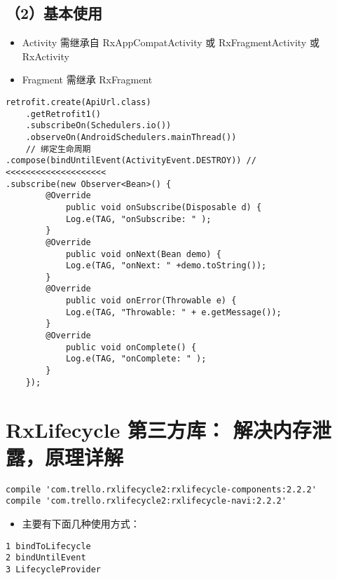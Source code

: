 \documentclass[9pt, b5paper]{article}
\begin{document}
\subsection{（2）基本使用}
\label{sec-19-4}
\begin{itemize}
\item Activity 需继承自 RxAppCompatActivity 或 RxFragmentActivity 或 RxActivity
\item Fragment 需继承  RxFragment
\end{itemize}
\begin{verbatim}
retrofit.create(ApiUrl.class)
    .getRetrofit1()
    .subscribeOn(Schedulers.io())
    .observeOn(AndroidSchedulers.mainThread())
    // 绑定生命周期
.compose(bindUntilEvent(ActivityEvent.DESTROY)) // <<<<<<<<<<<<<<<<<<<< 
.subscribe(new Observer<Bean>() {
        @Override
            public void onSubscribe(Disposable d) {
            Log.e(TAG, "onSubscribe: " );
        }
        @Override
            public void onNext(Bean demo) {
            Log.e(TAG, "onNext: " +demo.toString());
        }
        @Override
            public void onError(Throwable e) {
            Log.e(TAG, "Throwable: " + e.getMessage());
        }
        @Override
            public void onComplete() {
            Log.e(TAG, "onComplete: " );
        }
    });
\end{verbatim}

\section{RxLifecycle 第三方库： 解决内存泄露，原理详解}
\label{sec-20}
\begin{verbatim}
compile 'com.trello.rxlifecycle2:rxlifecycle-components:2.2.2'
compile 'com.trello.rxlifecycle2:rxlifecycle-navi:2.2.2'
\end{verbatim}
\begin{itemize}
\item 主要有下面几种使用方式：
\end{itemize}
\begin{verbatim}
1 bindToLifecycle
2 bindUntilEvent
3 LifecycleProvider
\end{verbatim}
\end{document}
